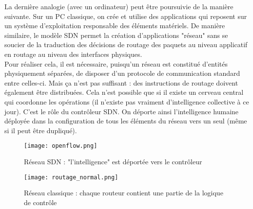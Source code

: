La dernière analogie (avec un ordinateur) peut être poursuivie de la manière suivante. Sur un PC classique, on crée et utilise des applications qui reposent sur un système d'exploitation responsable des éléments matériels. De manière similaire, le modèle SDN permet la création d'applications "réseau" sans se soucier de la traduction des décisions de routage des paquets au niveau applicatif en routage au niveau des interfaces physiques.\\

Pour réaliser cela, il est nécessaire, puisqu'un réseau est constitué d'entités physiquement séparées, de disposer d'un protocole de communication standard entre celles-ci. Mais ça n'est pas suffisant : des instructions de routage doivent également être distribuées. Cela n'est possible que si il existe un cerveau central qui coordonne les opérations (il n'existe pas vraiment d'intelligence collective à ce jour). C'est le rôle du contrôleur SDN. On déporte ainsi l'intelligence humaine déployée dans la configuration de tous les éléments du réseau vers un seul (même si il peut être dupliqué).\\

\begin{figure}[h]
  	\centering
  	\texttt{[image: openflow.png]}
  	\caption[Caption for LOF]{Réseau SDN : "l'intelligence" est déportée vers le contrôleur \footnotemark}
\end{figure}


\begin{figure}[h]
  	\centering
  	\texttt{[image: routage\_normal.png]}
  	\caption{Réseau classique : chaque routeur contient une partie de la logique de contrôle}
\end{figure}

